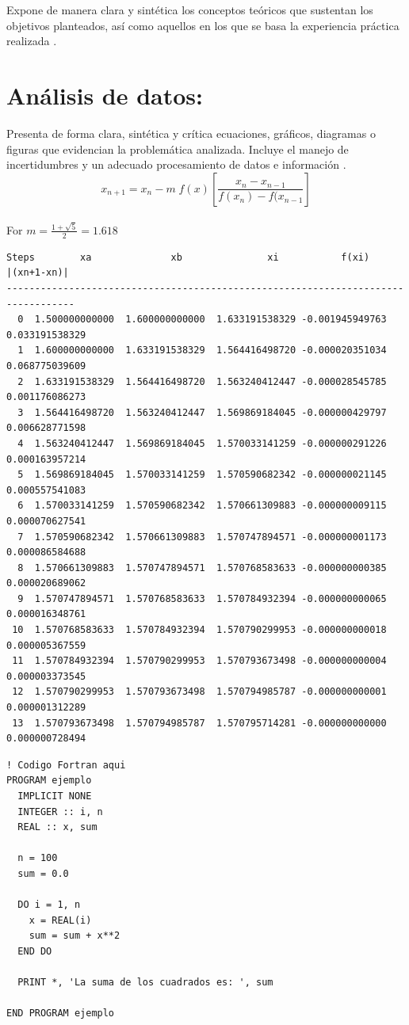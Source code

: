\documentclass[10pt,a4paper]{article}
\begin{document}
Expone de manera clara y sintética los conceptos teóricos que sustentan los objetivos planteados, así como aquellos en los que se basa la experiencia práctica realizada  \cite{Ding_and_Williams, Ling2016v1, Ling2016v2, Ling2016v3}.  

\section{Análisis de datos:} 

Presenta de forma clara, sintética y crítica ecuaciones, gráficos, diagramas o figuras que evidencian la problemática analizada. Incluye el manejo de incertidumbres y un adecuado procesamiento de datos e información \cite{Yang_Kurth_Willians, Young2012v1, Young2012v2}.  
\begin{equation}
  x_{n+1}  =  x_n - m\;f(x)\left[\frac{x_n-x_{n-1}}{f(x_n)-f(x_{n-1}}\right]
\end{equation}
\hspace{1mm}\\
For $m=\frac{1+\sqrt{5}}{2}=1.618$\\
\begin{verbatim}
Steps        xa              xb               xi           f(xi)       |(xn+1-xn)|
----------------------------------------------------------------------------------
  0  1.500000000000  1.600000000000  1.633191538329 -0.001945949763  0.033191538329 
  1  1.600000000000  1.633191538329  1.564416498720 -0.000020351034  0.068775039609 
  2  1.633191538329  1.564416498720  1.563240412447 -0.000028545785  0.001176086273 
  3  1.564416498720  1.563240412447  1.569869184045 -0.000000429797  0.006628771598 
  4  1.563240412447  1.569869184045  1.570033141259 -0.000000291226  0.000163957214 
  5  1.569869184045  1.570033141259  1.570590682342 -0.000000021145  0.000557541083 
  6  1.570033141259  1.570590682342  1.570661309883 -0.000000009115  0.000070627541 
  7  1.570590682342  1.570661309883  1.570747894571 -0.000000001173  0.000086584688 
  8  1.570661309883  1.570747894571  1.570768583633 -0.000000000385  0.000020689062 
  9  1.570747894571  1.570768583633  1.570784932394 -0.000000000065  0.000016348761 
 10  1.570768583633  1.570784932394  1.570790299953 -0.000000000018  0.000005367559 
 11  1.570784932394  1.570790299953  1.570793673498 -0.000000000004  0.000003373545 
 12  1.570790299953  1.570793673498  1.570794985787 -0.000000000001  0.000001312289 
 13  1.570793673498  1.570794985787  1.570795714281 -0.000000000000  0.000000728494 
\end{verbatim}
\begin{lstlisting}
! Codigo Fortran aqui
PROGRAM ejemplo
  IMPLICIT NONE
  INTEGER :: i, n
  REAL :: x, sum

  n = 100
  sum = 0.0

  DO i = 1, n
    x = REAL(i)
    sum = sum + x**2
  END DO

  PRINT *, 'La suma de los cuadrados es: ', sum

END PROGRAM ejemplo
\end{lstlisting}
\end{document}
